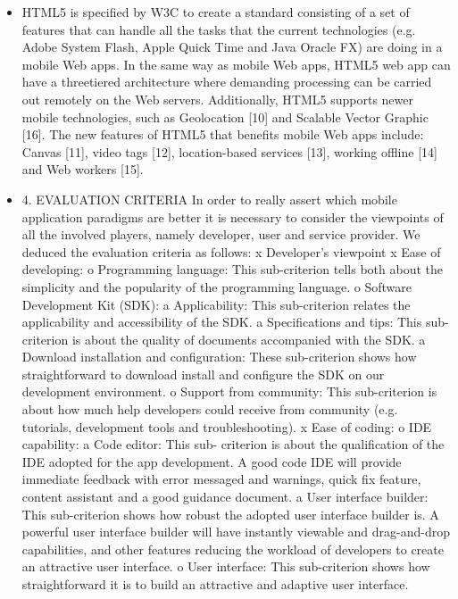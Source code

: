 \begin{itemize}
        \item
        HTML5 is specified by W3C to create a standard consisting of a set of features that can handle all the tasks that the current technologies (e.g. Adobe System Flash, Apple Quick Time and Java Oracle FX) are doing in a mobile Web apps. In the same way as mobile Web apps, HTML5 web app can have a threetiered architecture where demanding processing can be carried out remotely on the Web servers. Additionally, HTML5 supports newer mobile technologies, such as Geolocation [10] and Scalable Vector Graphic [16]. The new features of HTML5 that benefits mobile Web apps include: Canvas [11], video tags [12], location-based services [13], working offline [14] and Web workers [15]. \cite{Mobile_App_Paradigms}
        \item
        4. EVALUATION CRITERIA In order to really assert which mobile application paradigms are better it is necessary to consider the viewpoints of all the involved players, namely developer, user and service provider. We deduced the evaluation criteria as follows:
        x Developer’s viewpoint
         x Ease of developing:
            o  Programming language: This sub-criterion tells both about the simplicity and the popularity of the programming language.
            o Software Development Kit (SDK):
                a Applicability: This sub-criterion relates the applicability and accessibility of the SDK.
                a Specifications and tips: This sub-criterion is about the quality of documents accompanied with the SDK.
                a Download installation and configuration: These sub-criterion shows how straightforward to download install and configure the SDK on our development environment.
            o Support from community: This sub-criterion is about how much help developers could receive from community (e.g. tutorials, development tools and troubleshooting).
        x Ease of coding:
            o IDE capability:
                a Code editor: This sub- criterion is about the qualification of the IDE adopted for the app development. A good code IDE will provide immediate feedback with error messaged and warnings, quick fix feature, content assistant and a good guidance document.
                a User interface builder: This sub-criterion shows how robust the adopted user interface builder is. A powerful user interface builder will have instantly viewable and drag-and-drop capabilities, and other features reducing the workload of developers to create an attractive user interface.
            o User interface: This sub-criterion shows how straightforward it is to build an attractive and adaptive user interface.

\end{itemize}
